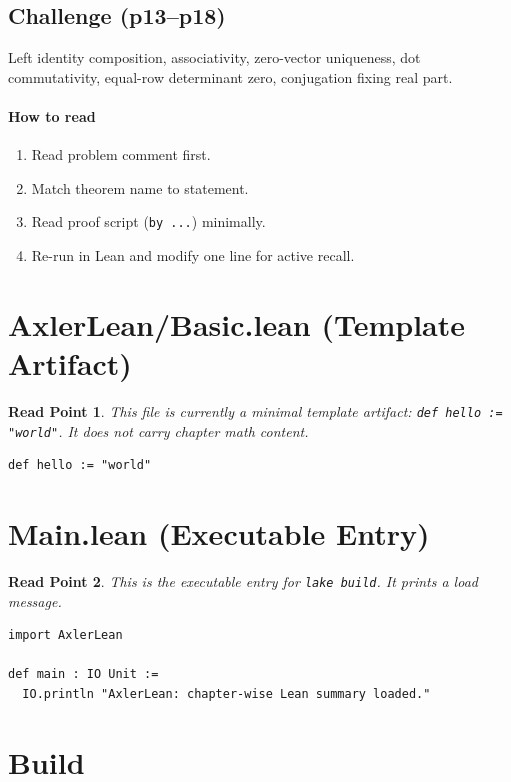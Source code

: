 \documentclass[11pt]{article}
\newtheorem*{readpoint}{Read Point}
\begin{document}
\subsection*{Challenge (p13--p18)}
Left identity composition, associativity, zero-vector uniqueness, dot commutativity,
equal-row determinant zero, conjugation fixing real part.

\paragraph{How to read}
\begin{enumerate}[leftmargin=1.5em]
  \item Read problem comment first.
  \item Match theorem name to statement.
  \item Read proof script (\texttt{by ...}) minimally.
  \item Re-run in Lean and modify one line for active recall.
\end{enumerate}

\section{AxlerLean/Basic.lean (Template Artifact)}
\begin{readpoint}
This file is currently a minimal template artifact:
\texttt{def hello := "world"}.
It does not carry chapter math content.
\end{readpoint}

\begin{lstlisting}
def hello := "world"
\end{lstlisting}

\section{Main.lean (Executable Entry)}
\begin{readpoint}
This is the executable entry for \texttt{lake build}. It prints a load message.
\end{readpoint}

\begin{lstlisting}
import AxlerLean

def main : IO Unit :=
  IO.println "AxlerLean: chapter-wise Lean summary loaded."
\end{lstlisting}

\section*{Build}
\end{document}

